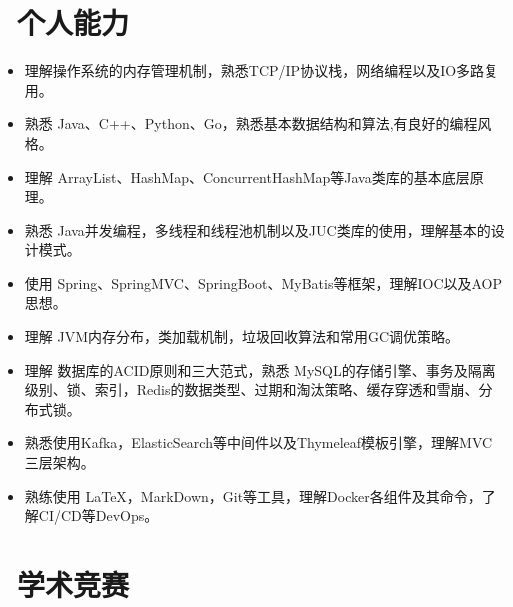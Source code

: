 \documentclass{resume}
\begin{document}
\section{\faCogs\ 个人能力}
\begin{itemize}[parsep=0.5ex]
  \item 理解操作系统的内存管理机制，熟悉TCP/IP协议栈，网络编程以及IO多路复用。
  \item 熟悉 Java、C++、Python、Go，熟悉基本数据结构和算法,有良好的编程风格。
  \item 理解 ArrayList、HashMap、ConcurrentHashMap等Java类库的基本底层原理。
  \item 熟悉 Java并发编程，多线程和线程池机制以及JUC类库的使用，理解基本的设计模式。
  \item 使用 Spring、SpringMVC、SpringBoot、MyBatis等框架，理解IOC以及AOP思想。
  \item 理解 JVM内存分布，类加载机制，垃圾回收算法和常用GC调优策略。
  \item 理解 数据库的ACID原则和三大范式，熟悉 MySQL的存储引擎、事务及隔离级别、锁、索引，Redis的数据类型、过期和淘汰策略、缓存穿透和雪崩、分布式锁。
  \item 熟悉使用Kafka，ElasticSearch等中间件以及Thymeleaf模板引擎，理解MVC三层架构。
  \item 熟练使用 \LaTeX，MarkDown，Git等工具，理解Docker各组件及其命令，了解CI/CD等DevOps。
\end{itemize}

\vspace{-1ex}
\vspace{-1ex}

\section{\faTrophy\ 学术竞赛}



%
%
\end{document}
